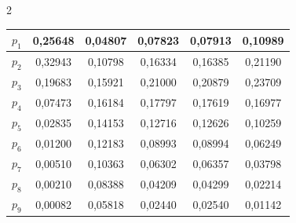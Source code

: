 \begin{multicols}{2}
\begin{table}
\begin{center}
\begin{tabular}{|l|c|c|c|c|c|}
\hline


\hspace*{10mm}$p_1$         & 0,25648 & 0,04807 & 0,07823 & 0,07913 & 0,10989\\


\hline


\hspace*{10mm}$p_2$         & 0,32943 & 0,10798 & 0,16334 & 0,16385 & 0,21190\\


\hline


\hspace*{10mm}$p_3$         & 0,19683 & 0,15921 & 0,21000 & 0,20879 & 0,23709\\


\hline


\hspace*{10mm}$p_4$         & 0,07473 & 0,16184 & 0,17797 & 0,17619 & 0,16977\\


\hline


\hspace*{10mm}$p_5$         & 0,02835 & 0,14153 & 0,12716 & 0,12626 & 0,10259\\


\hline


\hspace*{10mm}$p_6$         & 0,01200 & 0,12183 & 0,08993 & 0,08994 & 0,06249\\


\hline


\hspace*{10mm}$p_7$         & 0,00510 & 0,10363 & 0,06302 & 0,06357 & 0,03798\\


\hline


\hspace*{10mm}$p_8$         & 0,00210 & 0,08388 & 0,04209 & 0,04299 & 0,02214\\


\hline


\hspace*{10mm}$p_9$         & 0,00082 & 0,05818 & 0,02440 & 0,02540 & 0,01142\\


\hline


\end{tabular}


\end{center}


\end{table}






\end{multicols}
